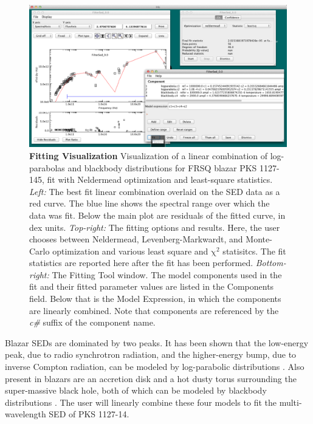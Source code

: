 \documentclass[5p]{elsarticle}
\begin{document}
\begin{figure}
\begin{center}
\includegraphics[height=0.3\textheight]{figures/fitting-1.png}
\caption{\textbf{\label{fig:fitting1} Fitting Visualization} Visualization of a linear combination of log-parabolas and blackbody distributions for FRSQ blazar PKS 1127-145, fit with Neldermead optimization and least-square statistics. \textit{Left:} The best fit linear combination overlaid on the SED data as a red curve. The blue line shows the spectral range over which the data was fit. Below the main plot are residuals of the fitted curve, in dex units. \textit{Top-right:} The fitting options and results. Here, the user chooses between Neldermead, Levenberg-Markwardt, and Monte-Carlo optimization and various least square and $\mathrm{\chi}^{2}$ statisitcs. The fit statistics are reported here after the fit has been performed. \textit{Bottom-right:} The Fitting Tool window. The model components used in the fit and their fitted parameter values are listed in the Components field. Below that is the Model Expression, in which the components are linearly combined. Note that components are referenced by the \textit{c\#} suffix of the component name.}
\end{center}
\end{figure}

Blazar SEDs are dominated by two peaks. It has been shown that the low-energy peak, due to radio synchrotron radiation, and the higher-energy bump, due to inverse Compton radiation, can be modeled by log-parabolic distributions \citep{2006A&A...448..861M,2009A&A...501..879T}. Also present in blazars are an accretion disk and a hot dusty torus surrounding the super-massive black hole, both of which can be modeled by blackbody distributions \citep{2002ApJ...575..667D}. The user will linearly combine these four models to fit the multi-wavelength SED of PKS 1127-14.  
\end{document}
